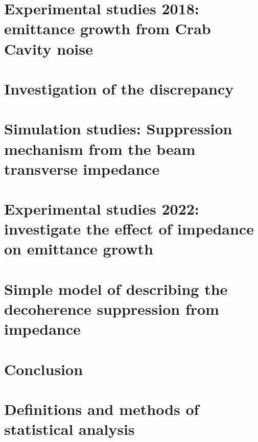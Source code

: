 \documentclass[12pt,twoside]{report} %
\begin{document}
\chapter{Experimental studies 2018: emittance growth from Crab Cavity noise}\label{Ch:2018_analyisis}


%

\chapter{Investigation of the discrepancy}\label{Ch:investigating_discrepancy}


\chapter{Simulation studies: Suppression mechanism from the beam transverse impedance}\label{Ch:suppression_impedances}\label{Ch:suppression_impedance}


\chapter{Experimental studies 2022: investigate the effect of impedance on emittance growth}\label{Ch:experimental_CC_2022}


\chapter{Simple model of describing the decoherence suppression from impedance}







\chapter{Conclusion}\label{Ch:conclusion}


\printglossaries
\appendix
\chapter{Definitions and  methods of statistical analysis}\label{ch:app_A}

\end{document}

